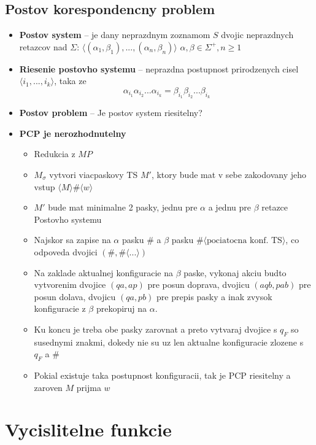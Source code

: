 \documentclass[12pt]{article}
\begin{document}
\subsection*{Postov korespondencny problem}
\begin{itemize}
	\item \textbf{Postov system} -- je dany neprazdnym zoznamom $S$ dvojic neprazdnych retazcov nad $\Sigma$: $\langle (\alpha_{1}, \beta_{1}), ..., (\alpha_{n}, \beta_{n})\rangle$
		$\alpha,\beta \in \Sigma^{+}, n \ge 1$
	\item \textbf{Riesenie postovho systemu} -- neprazdna postupnost prirodzenych cisel $\langle i_{1},...,i_{k}\rangle$, taka ze
		\begin{equation*}
			\alpha_{i_{1}}\alpha_{i_{2}}...\alpha_{i_{k}} = \beta_{i_{1}}\beta_{i_{2}}...\beta_{i_{k}}
		\end{equation*}
	\item \textbf{Postov problem} -- Je postov system riesitelny?
	\item \textbf{PCP je nerozhodnutelny}
		\begin{itemize}
			\item Redukcia z $MP$
			\item $M_{\sigma}$ vytvori viacpaskovy TS $M'$, ktory bude mat v sebe zakodovany jeho vstup $\langle M \rangle \# \langle w \rangle$
			\item $M'$ bude mat minimalne 2 pasky, jednu pre $\alpha$ a jednu pre $\beta$ retazce Postovho systemu
			\item Najskor sa zapise na $\alpha$ pasku $\#$ a $\beta$ pasku $\#\langle\text{pociatocna konf. TS}\rangle$, co odpoveda dvojici $(\#,\#\langle...\rangle)$
			\item Na zaklade aktualnej konfiguracie na $\beta$ paske, vykonaj akciu budto vytvorenim dvojice $(qa,ap)$ pre posun doprava, dvojicu $(aqb,pab)$ pre posun dolava,
				dvojicu $(qa,pb)$ pre prepis pasky a inak zvysok konfiguracie z $\beta$ prekopiruj na $\alpha$.
			\item Ku koncu je treba obe pasky zarovnat a preto vytvaraj dvojice s $q_{F}$ so susednymi znakmi, dokedy nie su uz len aktualne konfiguracie zlozene s $q_{F}$ a $\#$
			\item Pokial existuje taka postupnost konfiguracii, tak je PCP riesitelny a zaroven $M$ prijma $w$
		\end{itemize}
\end{itemize}

\section{Vycislitelne funkcie}
\end{document}
